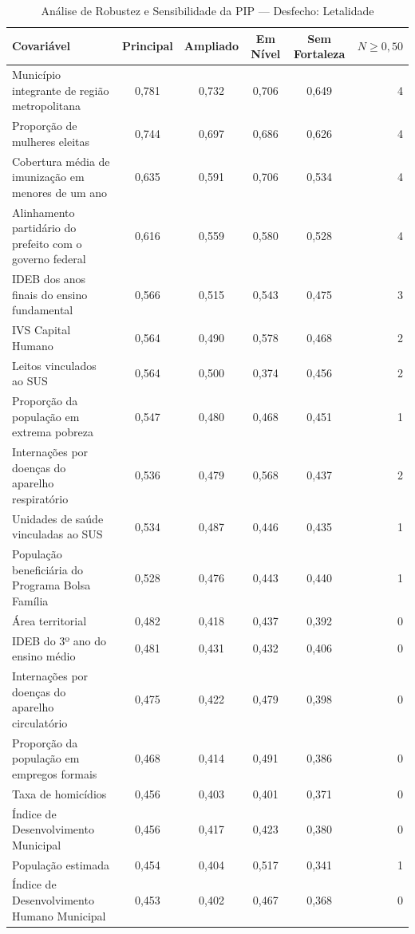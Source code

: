 \begin{table}[htbp]
\centering
\footnotesize
\caption{Análise de Robustez e Sensibilidade da PIP — Desfecho: Letalidade}
\label{tab:sens_letalidade}
\begin{tabular}{lccccr}
\toprule
\textbf{Covariável} & \textbf{Principal} & \textbf{Ampliado} & \textbf{Em Nível} & \textbf{Sem Fortaleza} & \textbf{$N \ge 0{,}50$} \\
\midrule
Município integrante de região metropolitana & 0,781 & 0,732 & 0,706 & 0,649 & 4 \\
Proporção de mulheres eleitas & 0,744 & 0,697 & 0,686 & 0,626 & 4 \\
Cobertura média de imunização em menores de um ano & 0,635 & 0,591 & 0,706 & 0,534 & 4 \\
Alinhamento partidário do prefeito com o governo federal & 0,616 & 0,559 & 0,580 & 0,528 & 4 \\
IDEB dos anos finais do ensino fundamental & 0,566 & 0,515 & 0,543 & 0,475 & 3 \\
IVS Capital Humano & 0,564 & 0,490 & 0,578 & 0,468 & 2 \\
Leitos vinculados ao SUS & 0,564 & 0,500 & 0,374 & 0,456 & 2 \\
Proporção da população em extrema pobreza & 0,547 & 0,480 & 0,468 & 0,451 & 1 \\
Internações por doenças do aparelho respiratório & 0,536 & 0,479 & 0,568 & 0,437 & 2 \\
Unidades de saúde vinculadas ao SUS & 0,534 & 0,487 & 0,446 & 0,435 & 1 \\
População beneficiária do Programa Bolsa Família & 0,528 & 0,476 & 0,443 & 0,440 & 1 \\
Área territorial & 0,482 & 0,418 & 0,437 & 0,392 & 0 \\
IDEB do 3º ano do ensino médio & 0,481 & 0,431 & 0,432 & 0,406 & 0 \\
Internações por doenças do aparelho circulatório & 0,475 & 0,422 & 0,479 & 0,398 & 0 \\
Proporção da população em empregos formais & 0,468 & 0,414 & 0,491 & 0,386 & 0 \\
Taxa de homicídios & 0,456 & 0,403 & 0,401 & 0,371 & 0 \\
Índice de Desenvolvimento Municipal & 0,456 & 0,417 & 0,423 & 0,380 & 0 \\
População estimada & 0,454 & 0,404 & 0,517 & 0,341 & 1 \\
Índice de Desenvolvimento Humano Municipal & 0,453 & 0,402 & 0,467 & 0,368 & 0 \\

\end{tabular}
\end{table}
